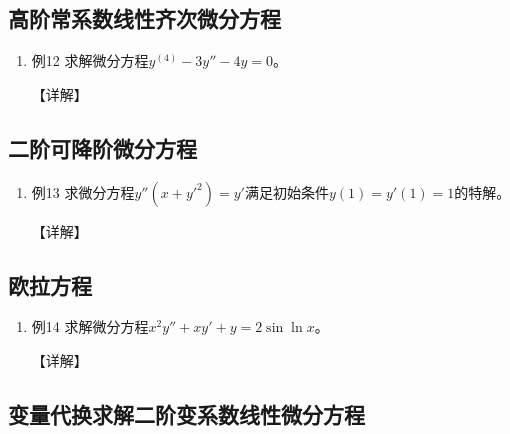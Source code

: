 \documentclass[12pt, a4paper, oneside, UTF8]{ctexbook}
\begin{document}
\subsection{ 高阶常系数线性齐次微分方程}

\begin{enumerate}[label=\arabic*.,start=12]
    \item 例12 求解微分方程$y^{(4)}-3y''-4y=0$。
    
    \begin{solution}
    【详解】
    \end{solution}
\end{enumerate}

\subsection{ 二阶可降阶微分方程}

\begin{remark}
\end{remark}

\begin{enumerate}[label=\arabic*.,start=13]
    \item 例13 求微分方程$y''(x+y'^2)=y'$满足初始条件$y(1)=y'(1)=1$的特解。
    
    \begin{solution}
    【详解】
    \end{solution}
\end{enumerate}

\subsection{ 欧拉方程}

\begin{remark}
\end{remark}

\begin{enumerate}[label=\arabic*.,start=14]
    \item 例14 求解微分方程$x^2y''+xy'+y=2\sin\ln x$。
    
    \begin{solution}
    【详解】
    \end{solution}
\end{enumerate}

\subsection{ 变量代换求解二阶变系数线性微分方程}
\end{document}
